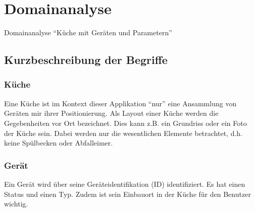
\section{Domainanalyse}
\label{sec:Domainanalyse}
\centerline{
}
\caption{Domainanalyse \enquote{Küche mit Geräten und Parametern}}

\subsection{Kurzbeschreibung der Begriffe}
\label{subsec:Kurzbeschreibung der Begriffe}

\subsubsection{Küche}
\label{subsubsec:Küche}
Eine Küche ist im Kontext dieser Applikation \enquote{nur} eine Ansammlung von Geräten mir ihrer Positionierung. Als Layout einer Küche werden die Gegebenheiten vor Ort bezeichnet. Dies kann z.B. ein Grundriss oder ein Foto der Küche sein. Dabei werden nur die wesentlichen Elemente betrachtet, d.h. keine Spülbecken oder Abfalleimer.

\subsubsection{Gerät}
\label{subsubsec:Gerät}
Ein Gerät wird über seine Geräteidentifikation (ID) identifiziert. Es hat einen Status und einen Typ. Zudem ist sein Einbauort in der Küche für den Benutzer wichtig.

